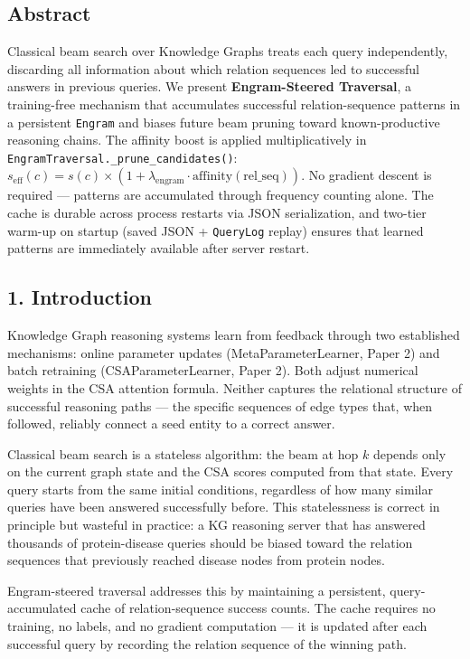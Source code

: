 
\subsection*{Abstract}
Classical beam search over Knowledge Graphs treats each query independently, discarding all information about which relation sequences led to successful answers in previous queries. We present \textbf{Engram-Steered Traversal}, a training-free mechanism that accumulates successful relation-sequence patterns in a persistent \texttt{Engram} and biases future beam pruning toward known-productive reasoning chains. The affinity boost is applied multiplicatively in \texttt{EngramTraversal.\_prune\_candidates()}: $s_\text{eff}(c) = s(c) \times (1 + \lambda_\text{engram} \cdot \text{affinity}(\text{rel\_seq}))$. No gradient descent is required --- patterns are accumulated through frequency counting alone. The cache is durable across process restarts via JSON serialization, and two-tier warm-up on startup (saved JSON + \texttt{QueryLog} replay) ensures that learned patterns are immediately available after server restart.

\subsection*{1. Introduction}
Knowledge Graph reasoning systems learn from feedback through two established mechanisms: online parameter updates (MetaParameterLearner, Paper 2) and batch retraining (CSAParameterLearner, Paper 2). Both adjust numerical weights in the CSA attention formula. Neither captures the relational structure of successful reasoning paths --- the specific sequences of edge types that, when followed, reliably connect a seed entity to a correct answer.

Classical beam search \cite{vaswani2017attention} is a stateless algorithm: the beam at hop $k$ depends only on the current graph state and the CSA scores computed from that state. Every query starts from the same initial conditions, regardless of how many similar queries have been answered successfully before. This statelessness is correct in principle but wasteful in practice: a KG reasoning server that has answered thousands of protein-disease queries should be biased toward the relation sequences that previously reached disease nodes from protein nodes.

Engram-steered traversal addresses this by maintaining a persistent, query-accumulated cache of relation-sequence success counts. The cache requires no training, no labels, and no gradient computation --- it is updated after each successful query by recording the relation sequence of the winning path.

